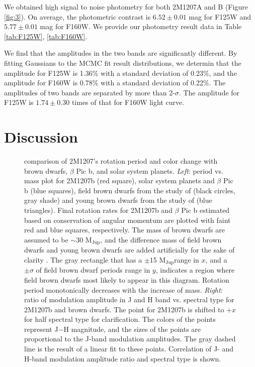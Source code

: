 \documentclass[apj]{emulateapj}
\newcommand{\bpic}{$\beta$ Pic}
\newcommand{\mjup}{M$_{\mbox{Jup}}$}
\begin{document}
We obtained high signal to noise photometry for both 2M1207A
and B (Figure \ref{fig:3}). On average, the photometric contrast is
$6.52\pm0.01$ mag for F125W and $5.77\pm0.01$ mag for F160W. We
provide our photometry result data in Table \ref{tab:F125W}, \ref{tab:F160W}.


We find that the amplitudes in the two bands are
significantly different. By fitting Gaussians to the MCMC fit result
distributions, we determin that the  amplitude for F125W is
1.36\% with a standard deviation of 0.23\%, and  the amplitude for F160W is
0.78\% with a standard deviation of 0.22\%. The amplitudes of two
bands are separated by more than 2-$\sigma$. The amplitude
for F125W is $1.74\pm0.30$ times of that for F160W light curve.


\section{Discussion}
\label{sec:discussion}
\begin{figure}
  \centering
  \caption{comparison of 2M1207's rotation period and color change
    with brown dwarfs, \bpic{} b, and solar system planets. {\em
      Left}: period vs. mass plot for 2M1207b (red square), solar
    system planets and \bpic{} b (blue squares), field brown dwarfs
    from the study of \citet[][]{Metchev2015}
    (black circles, gray shade) and young brown dwarfs from the study
    of \citet{Scholz2015} (blue
    triangles). Final rotation rates for 2M1207b and \bpic{} b
    estimated based on conservation of angular momentum are plotted
    with faint red and blue squares, respectively. The mass of brown
    dwarfs are assumed to be $\sim30$ \mjup{}, and the difference mass
    of field brown dwarfs and young brown dwarfs are added
    artificially for the sake of clarity . The gray rectangle that has a
    $\pm$15
    \mjup range in $x$,
    and a $\pm \sigma$
    of field brown dwarf periods range in $y$,
    indicates a region where field brown dwarfs most likely to appear in
    this diagram. Rotation period monotonically decreases with the
    increase of mass. {\em Right}: ratio of modulation amplitude in J
    and H band vs. spectral type for 2M1207b and brown dwarfs. The
    point for 2M1207b is shifted to +$x$
    for half spectral type for clarification.  The colors of the
    points represent J$-$H
    magnitude, and the sizes of the points are proportional to the
    J-band modulation amplitudes. The gray dashed line is the result
    of a linear fit to these points.  Correlation of J- and H-band
    modulation amplitude ratio and spectral type is shown.}
 \label{fig:5}
\end{figure}
\end{document}
